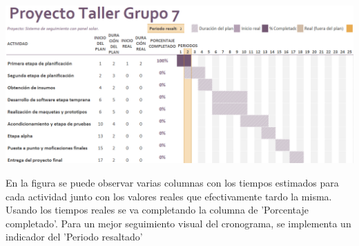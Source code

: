\documentclass[a4paper,12pt]{article}
\begin{document}
\newpage
\begin{landscape}
    \thispagestyle{empty} %
    \begin{center}
        \includegraphics[width=0.95\linewidth]{grantt-V3.png}
        \label{cronograma}
    \end{center}
    En la figura se puede observar varias columnas con los tiempos estimados para cada actividad junto con los valores reales que efectivamente tardo la misma. Usando los tiempos reales se va completando la columna de 'Porcentaje completado'. Para un mejor seguimiento visual del cronograma, se implementa un indicador del 'Periodo resaltado'
\end{landscape}
\end{document}
